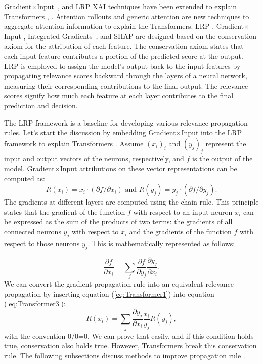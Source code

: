 \documentclass[final,5p,times,twocolumn]{elsarticle}
\begin{document}
Gradient$\times$Input~\cite{ancona2019explaining}, \cite{shrikumar2017learning} and LRP \cite{bach2015pixel} XAI techniques have been extended to explain Transformers \cite{voita2019analyzing}, \cite{wu2021explaining}. Attention rollouts \cite{abnar2020quantifying} and generic attention are new techniques to aggregate attention information \cite{chefer2021generic} to explain the Transformers. LRP \cite{bach2015pixel}, Gradient$\times$Input \cite{ancona2017towards}, Integrated Gradients~\cite{sundararajan2017axiomatic}, and SHAP \cite{lundberg2017unified} are designed based on the conservation axiom for the attribution of each feature. The conservation axiom states that each input feature contributes a portion of the predicted score at the output. LRP is employed to assign the model's output back to the input features by propagating relevance scores backward through the layers of a neural network, measuring their corresponding contributions to the final output.  The relevance scores signify how much each feature at each layer contributes to the final prediction and decision.

The LRP framework is a baseline for developing various relevance propagation rules. Let's start the discussion by embedding Gradient$\times$Input into the LRP framework to explain Transformers \cite{ali2022xai}. Assume $(x_{i})_{i}$ and $(y_{j})_{j}$ represent the input and output vectors of the neurons, respectively,  and $f$ is the output of the model. Gradient$\times $Input attributions on these vector representations can be computed as:
\begin{equation}
  R(x_{i})= x_{i} \cdot (\partial f / \partial x_{i}) \text{ and } R(y_{j})= y_{j} \cdot (\partial f / \partial y_{j}). \label{eq:Transformer1} 
\end{equation}
The gradients at different layers are computed using the chain rule. This principle states that the gradient of the function $f$ with respect to an input neuron $x_{i}$ can be expressed as the sum of the products of two terms: the gradients of all connected neurons  $y_{j}$ with respect to $x_{i}$ and the gradients of the function $f$ with respect to those neurons $y_{j}$. This is mathematically represented as follows:

\begin{equation}
   \frac{\partial f} { \partial x_{i}} = \sum_{j}\frac{\partial f }  {\partial y_{j}} \frac{\partial y_{j} }  {\partial x_{i}}  . \label{eq:Transformer3} 
\end{equation}
We can convert the gradient propagation rule into an equivalent relevance propagation by inserting equation (\ref{eq:Transformer1}) into equation (\ref{eq:Transformer3}):
\begin{equation}
    R(x_{i}) = \sum_{j} \frac{\partial y_{j} }  {\partial x_{i}}  \frac{x_{i}} {y_{j}} R(y_{j}), \label{eq:Transformer4} 
\end{equation}
with the convention 0/0=0. We can prove that  easily, and if this condition holds true, conservation also holds true. However, Transformers break this conservation rule. The following subsections discuss methods to improve propagation rule \cite{ali2022xai}.
\end{document}
